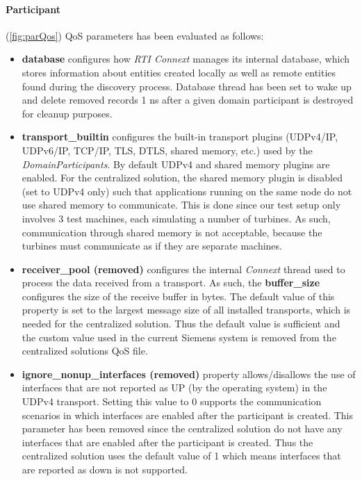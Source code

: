 \paragraph{Participant} (\cref{fig:parQos}) QoS parameters has been evaluated as follows:
 
\begin{itemize}
	\item \textbf{database} configures how \textit{RTI Connext} manages its internal database, which stores information about entities created locally as well as remote entities found during the discovery process. Database thread has been set to wake up and delete removed records 1 ns after a given domain participant is destroyed for cleanup purposes.
	
	\item \textbf{transport\_builtin} configures the built-in transport plugins (UDPv4/IP, UDPv6/IP, TCP/IP, TLS, DTLS, shared memory, etc.) used by the \textit{DomainParticipants}. By default UDPv4 and shared memory plugins are enabled. For the centralized solution, the shared memory plugin is disabled (set to UDPv4 only) such that applications running on the same node do not use shared memory to communicate. This is done since our test setup only involves 3 test machines, each simulating a number of turbines. As such, communication through shared memory is not acceptable, because the turbines must communicate as if they are separate machines.
	
	\item \textbf{receiver\_pool (removed)} configures the internal \textit{Connext} thread used to process the data received from a transport. As such, the \textbf{buffer\_size} configures the size of the receive buffer in bytes. The default value of this property is set to the largest message size of all installed transports, which is needed for the centralized solution. Thus the default value is sufficient and the custom value used in the current Siemens system is removed from the centralized solutions QoS file.
	
	\item \textbf{ignore\_nonup\_interfaces (removed)} property allows/disallows the use of interfaces that are not reported as UP (by the operating system) in the UDPv4 transport. Setting this value to 0 supports the communication scenarios in which interfaces are enabled after the participant is created. This parameter has been removed since the centralized solution do not have any interfaces that are enabled after the participant is created. Thus the centralized solution uses the default value of 1 which means interfaces that are reported as down is not supported.
	

\end{itemize}
